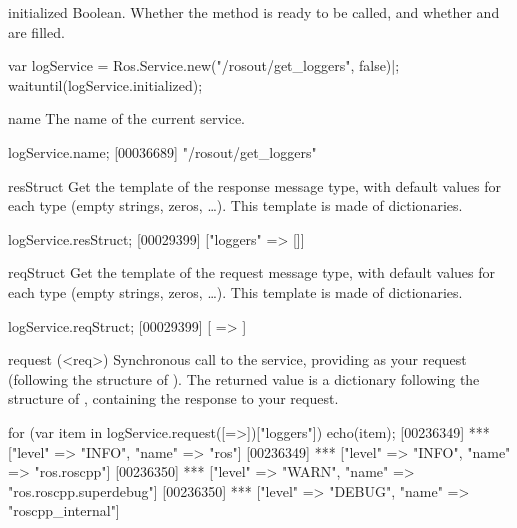 \begin{urbiscriptapi}

\item[initialized]%
  Boolean.  Whether the method  is ready to be called, and
  whether  and  are filled.
\begin{urbiscript}
var logService = Ros.Service.new("/rosout/get_loggers", false)|;
waituntil(logService.initialized);
\end{urbiscript}

\item[name]%
  The name of the current service.
\begin{urbiscript}
logService.name;
[00036689] "/rosout/get_loggers"
\end{urbiscript}

\item[resStruct]%
  Get the template of the response message type, with default values for
  each type (empty strings, zeros, \ldots). This template is made of
  dictionaries.
\begin{urbiscript}
logService.resStruct;
[00029399] ["loggers" => []]
\end{urbiscript}

\item[reqStruct]%
  Get the template of the request message type, with default values for
  each type (empty strings, zeros, \ldots). This template is made of
  dictionaries.
\begin{urbiscript}
logService.reqStruct;
[00029399] [ => ]
\end{urbiscript}


\item[request](<req>)%
  Synchronous call to the service, providing  as your request
  (following the structure of ). The returned value is a
  dictionary following the structure of , containing the
  response to your request.
\begin{urbiscript}
for (var item in logService.request([=>])["loggers"])
  echo(item);
[00236349] *** ["level" => "INFO", "name" => "ros"]
[00236349] *** ["level" => "INFO", "name" => "ros.roscpp"]
[00236350] *** ["level" => "WARN", "name" => "ros.roscpp.superdebug"]
[00236350] *** ["level" => "DEBUG", "name" => "roscpp_internal"]
\end{urbiscript}

\end{urbiscriptapi}

